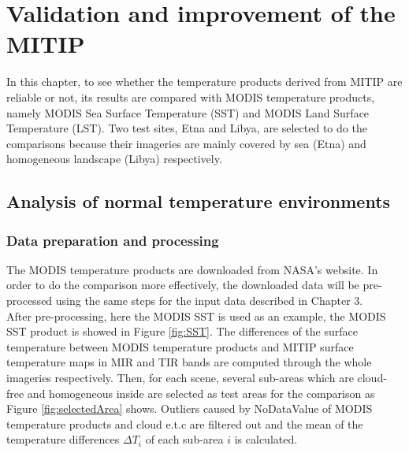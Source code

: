 \chapter{Validation and improvement of the MITIP}

\label{Chapter4}

In this chapter, to see whether the temperature products derived from MITIP are reliable or not, its results are compared with MODIS temperature products, namely MODIS Sea Surface Temperature (SST) and MODIS Land Surface Temperature (LST). Two test sites, Etna and Libya, are selected to do the comparisons because their imageries are mainly covered by sea (Etna) and homogeneous landscape (Libya) respectively.\\


\section{Analysis of normal temperature environments}


\subsection{Data preparation and processing}
The MODIS temperature products are downloaded from NASA's website. In order to do the comparison more effectively, the downloaded data will be pre-processed using the same steps for the input data described in Chapter 3.\\

\noindent After pre-processing, here the MODIS SST is used as an example, the MODIS SST product is showed in Figure \ref{fig:SST}. The differences of the surface temperature between MODIS temperature products and MITIP surface temperature maps in MIR and TIR bands are computed through the whole imageries respectively. Then, for each scene, several sub-areas which are cloud-free and homogeneous inside are selected as test areas for the comparison as Figure \ref{fig:selectedArea} shows. Outliers caused by NoDataValue of MODIS temperature products and cloud e.t.c are filtered out and the mean of the temperature differences $\Delta T_i$ of each sub-area $i$ is calculated.\\

